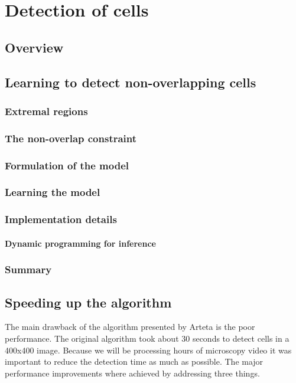 \chapter{Detection of cells }
	\label{chap:cell_detection}
	\section{Overview }
	\section{Learning to detect non-overlapping cells }
		
		\subsection{Extremal regions }
		\subsection{The non-overlap constraint }
		\subsection{Formulation of the model }
		\subsection{Learning the model }
		\subsection{Implementation details }
			\subsubsection{Dynamic programming for inference }
		\subsection{Summary }
	\section{Speeding up the algorithm }
	The main drawback of the algorithm presented by Arteta \cite{arteta12} is the poor performance. The original algorithm took about 30 seconds to detect cells in a 400x400 image. Because we will be processing hours of microscopy video it was important to reduce the detection time as much as possible.  The major performance improvements where achieved by addressing three things.
	
